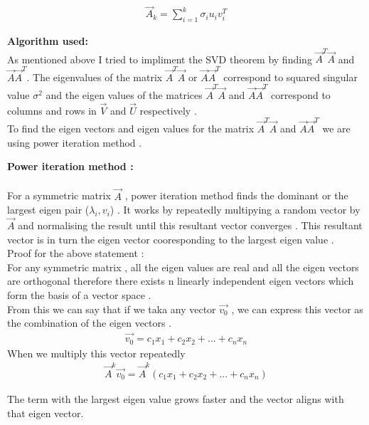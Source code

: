 \documentclass[journal]{IEEEtran}
\begin{document}
\begin{align*}
    \vec{A}_k = \sum_{i=1}^{k} \sigma_i u_i v_i^T
\end{align*}
\newpage

\textbf{Algorithm used:}\\

As mentioned above I tried to impliment the SVD theorem by finding $\vec{A}^T\vec{A}$ and $\vec{A}\vec{A}^T$. The eigenvalues of the matrix $\vec{A}^T\vec{A}$ or $\vec{A}\vec{A}^T$ correspond to squared singular value $\sigma^2$ and the eigen values of the matrices $\vec{A}^T\vec{A}$ and $\vec{A}\vec{A}^T$ correspond to columns and rows in $\vec{V}$ and $\vec{U}$ respectively .\\

To find the eigen vectors and eigen values for the matrix $\vec{A}^T\vec{A}$ and $\vec{A}\vec{A}^T$ we are using power iteration method .
\vspace{1em}

\textbf{Power iteration method :}\\
\\
For a symmetric matrix $\vec{A}$ , power iteration method finds the dominant or the largest eigen pair ($\lambda_i,v_i$) . It works by repeatedly multipying a random vector by $\vec{A}$ and normalising the result until this resultant vector converges . This resultant vector is in turn the eigen vector cooresponding to the largest eigen value . \\
\newline
 Proof for the above statement :\\
 For any symmetric matrix , all the eigen values are real and all the eigen vectors are orthogonal therefore there exists n linearly independent eigen vectors which form the basis of a vector space .\\
From this we can say that if we taka any vector $\vec{v_0}$ , we can express this vector as the combination of the eigen vectors .
\begin{align*}
    \vec{v_0} = c_1x_1 + c_2x_2 + ... + c_nx_n
\end{align*}
When we multiply this vector repeatedly
\begin{align*}
    \vec{A}^k\vec{v_0} =\vec{A}^k(c_1x_1 + c_2x_2 + ... + c_nx_n) 
\end{align*}

The term with the largest eigen value grows faster and the vector aligns with that eigen vector.\\
\end{document}
